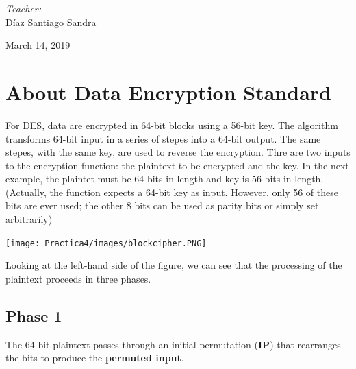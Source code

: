 \documentclass[12pt]{article}
\begin{document}
\begin{titlepage}
\begin{center}
\begin{minipage}{0.5\textwidth}
\begin{flushleft}
\begin{tabular}{ll}
					\end{tabular}
					\end{flushleft}
				\end{minipage}%
				\begin{minipage}{0.5\textwidth}
					\begin{flushright} \large
						\emph{Teacher:} \\
						Díaz Santiago Sandra  \\
					\end{flushright}
				\end{minipage}
				
				\vfill
				
				{\large March 14, 2019}
			\end{center}
		\end{titlepage}
	
	\tableofcontents
	\newpage
	
    \section{About Data Encryption Standard}
        For DES, data are encrypted in 64-bit blocks using a 56-bit key. The algorithm transforms 64-bit input in a series of stepes into a 64-bit output. The same stepes, with the same key, are used to reverse the encryption. Thre are two inputs to the encryption function: the plaintext to be encrypted and the key. In the next example, the plaintet must be 64 bits in length and key is 56 bits in length. (Actually, the function expects a 64-bit key as input. However, only 56 of these bits are ever used; the other 8 bits can be used as parity bits or simply set arbitrarily)

        \begin{center}
            \texttt{[image: Practica4/images/blockcipher.PNG]}
        \end{center}
        
        Looking at the left-hand side of the figure, we can see that the processing of the plaintext proceeds in three phases.

        \subsection{Phase 1}
            The 64 bit plaintext passes through an initial permutation (\textbf{IP}) that rearranges the bits to produce the \textbf{permuted input}. 
\end{document}
